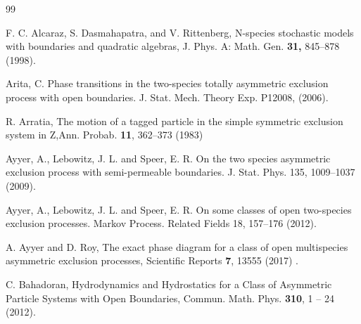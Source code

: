 \documentclass[12pt]{article}
\newcommand{\red}[1]{\textcolor{red}{#1}}
\begin{document}

\begin{thebibliography}{99}

%
F. C. Alcaraz, S. Dasmahapatra, and V. Rittenberg,
N-species stochastic models with boundaries and quadratic algebras,
J. Phys. A: Math. Gen. \textbf{31,} 845--878 (1998).

Arita, C. 
Phase transitions in the two-species totally asymmetric exclusion process with open boundaries. 
J. Stat. Mech. Theory Exp. P12008, (2006).

 R. Arratia, The motion of a tagged particle in the simple symmetric exclusion system in Z,Ann. Probab. \textbf{11}, 362--373 (1983)

Ayyer, A., Lebowitz, J. L. and Speer, E. R. 
On the two species asymmetric exclusion process with semi-permeable boundaries. 
J. Stat. Phys. 135, 1009–1037 (2009).

Ayyer, A., Lebowitz, J. L. and Speer, E. R. 
On some classes of open two-species exclusion processes. 
Markov Process. Related Fields 18, 157–176 (2012).

A. Ayyer and D. Roy,
The exact phase diagram for a class of open multispecies asymmetric exclusion processes,
Scientific Reports \textbf{7},  13555 (2017) .

C. Bahadoran,
Hydrodynamics and Hydrostatics for a Class of 
Asymmetric Particle Systems with Open Boundaries,
Commun. Math. Phys. {\bf 310}, 1 -- 24 (2012).

%


\end{thebibliography}
\end{document}

